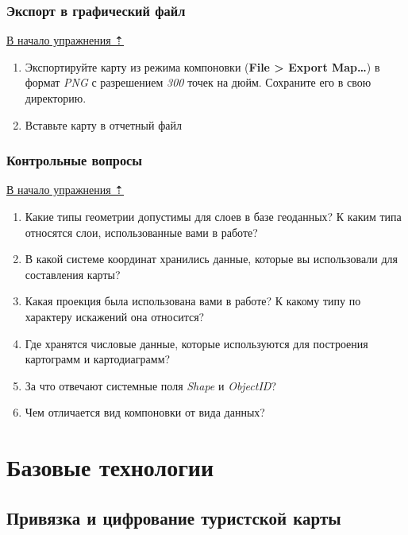 \documentclass[12pt,]{book}
\begin{document}
\hypertarget{map-design-economic-export}{%
\section{Экспорт в графический файл}\label{map-design-economic-export}}

\protect\hyperlink{map-design-economic}{В начало упражнения ⇡}

\begin{enumerate}
\def\labelenumi{\arabic{enumi}.}
\item
  Экспортируйте карту из режима компоновки (\textbf{File \textgreater{} Export Map\ldots{}}) в формат \emph{PNG} с разрешением \emph{300} точек на дюйм. Сохраните его в свою директорию.
\item
  Вставьте карту в отчетный файл
\end{enumerate}

\hypertarget{map-design-economic-questions}{%
\section{Контрольные вопросы}\label{map-design-economic-questions}}

\protect\hyperlink{map-design-economic}{В начало упражнения ⇡}

\begin{enumerate}
\def\labelenumi{\arabic{enumi}.}
\item
  Какие типы геометрии допустимы для слоев в базе геоданных? К каким типа относятся слои, использованные вами в работе?
\item
  В какой системе координат хранились данные, которые вы использовали для составления карты?
\item
  Какая проекция была использована вами в работе? К какому типу по характеру искажений она относится?
\item
  Где хранятся числовые данные, которые используются для построения картограмм и картодиаграмм?
\item
  За что отвечают системные поля \emph{Shape} и \emph{ObjectID}?
\item
  Чем отличается вид компоновки от вида данных?
\end{enumerate}

\hypertarget{part--}{%
\part{Базовые технологии}\label{part--}}

\hypertarget{map-ref-general}{%
\chapter{Привязка и цифрование туристской карты}\label{map-ref-general}}
\end{document}
